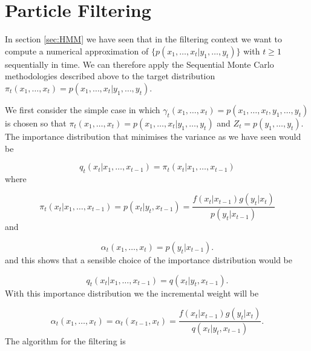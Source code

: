 \documentclass[11pt,a4paper]{article}
\begin{document}
\section{Particle Filtering} \label{sec:PF}

In section \ref{sec:HMM} we have seen that in the filtering context we want to compute a numerical approximation of $\{ p(x_1, \dots, x_t | y_1, \dots, y_t) \}$ with $t \geq 1$ sequentially in time. We can therefore apply the Sequential Monte Carlo methodologies described above to the target distribution $\pi_t(x_1, \dots, x_t) = p(x_1, \dots, x_t | y_1, \dots, y_t)$.

We first consider the simple case in which $\gamma_t (x_1, \dots, x_t) =  p(x_1, \dots, x_t , y_1, \dots, y_t)$ is chosen so that $\pi_t (x_1, \dots, x_t) = p(x_1, \dots, x_t | y_1, \dots, y_t)$ and $Z_t = p( y_1, \dots, y_t)$. The importance distribution that minimises the variance as we have seen would be

\begin{equation*}
    q_t( x_t | x_1, \dots, x_{t-1}) = \pi_t( x_t | x_1, \dots, x_{t-1})
\end{equation*}
where 

\begin{equation*}
    \pi_t( x_t | x_1, \dots, x_{t-1}) = p(x_t | y_t, x_{t-1}) = \frac{f(x_t | x_{t-1})g(y_t | x_t)}{p(y_t | x_{t-1})}
\end{equation*}
and

\begin{equation*}
    \alpha_t(x_1, \dots, x_t) = p(y_t | x_{t-1}).
\end{equation*}
and this shows that a sensible choice of the importance distribution would be 

\begin{equation*}
    q_t( x_t | x_1, \dots, x_{t-1}) = q(x_t | y_t, x_{t-1}).
\end{equation*}
With this importance distribution we the incremental weight will be

\begin{equation*}
    \alpha_t(x_1, \dots, x_t) = \alpha_t(x_{t-1}, x_t) = \frac{f(x_t | x_{t-1})g(y_t | x_t)}{q(x_t | y_t, x_{t-1})}.
\end{equation*}
The algorithm for the filtering is
\end{document}
